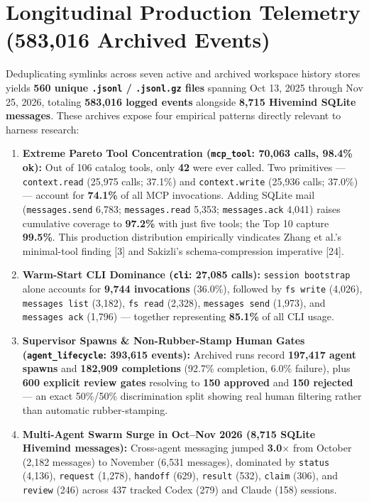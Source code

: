 \documentclass[10pt,letterpaper]{article}
\newcommand{\code}[1]{\texttt{\color{InkNavy}#1}}
\begin{document}
\section{Longitudinal Production Telemetry (583,016 Archived Events)}

Deduplicating symlinks across seven active and archived workspace history stores yields \textbf{560 unique \code{.jsonl} / \code{.jsonl.gz} files} spanning Oct 13, 2025 through Nov 25, 2026, totaling \textbf{583,016 logged events} alongside \textbf{8,715 Hivemind SQLite messages}. These archives expose four empirical patterns directly relevant to harness research:

\begin{enumerate}
  \item \textbf{Extreme Pareto Tool Concentration (\code{mcp\_tool}: 70,063 calls, 98.4\% ok):} Out of 106 catalog tools, only \textbf{42} were ever called. Two primitives --- \code{context.read} (25,975 calls; 37.1\%) and \code{context.write} (25,936 calls; 37.0\%) --- account for \textbf{74.1\%} of all MCP invocations. Adding SQLite mail (\code{messages.send} 6,783; \code{messages.read} 5,353; \code{messages.ack} 4,041) raises cumulative coverage to \textbf{97.2\%} with just five tools; the Top 10 capture \textbf{99.5\%}. This production distribution empirically vindicates Zhang et al.'s minimal-tool finding [3] and Sakizli's schema-compression imperative [24].
  \item \textbf{Warm-Start CLI Dominance (\code{cli}: 27,085 calls):} \code{session bootstrap} alone accounts for \textbf{9,744 invocations} (36.0\%), followed by \code{fs write} (4,026), \code{messages list} (3,182), \code{fs read} (2,328), \code{messages send} (1,973), and \code{messages ack} (1,796) --- together representing \textbf{85.1\%} of all CLI usage.
  \item \textbf{Supervisor Spawns \& Non-Rubber-Stamp Human Gates (\code{agent\_lifecycle}: 393,615 events):} Archived runs record \textbf{197,417 agent spawns} and \textbf{182,909 completions} (92.7\% completion, 6.0\% failure), plus \textbf{600 explicit review gates} resolving to \textbf{150 approved} and \textbf{150 rejected} --- an exact 50\%/50\% discrimination split showing real human filtering rather than automatic rubber-stamping.
  \item \textbf{Multi-Agent Swarm Surge in Oct--Nov 2026 (8,715 SQLite Hivemind messages):} Cross-agent messaging jumped \textbf{3.0$\times$} from October (2,182 messages) to November (6,531 messages), dominated by \code{status} (4,136), \code{request} (1,278), \code{handoff} (629), \code{result} (532), \code{claim} (306), and \code{review} (246) across 437 tracked Codex (279) and Claude (158) sessions.
\end{enumerate}
\end{document}
